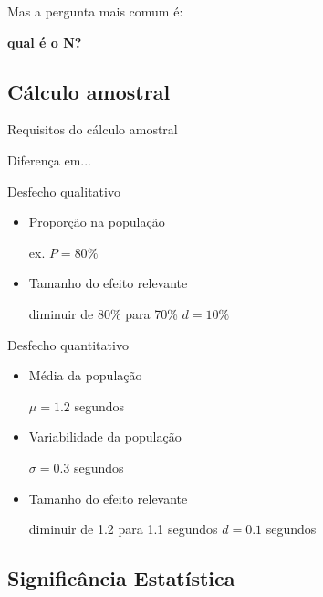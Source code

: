 \documentclass{beamer}
\begin{document}
\begin{frame}
  \begin{center}
    Mas a pergunta mais comum é:

  \bigskip
  {\bf qual é o N?}
  \end{center}
\end{frame}

\subsection{Cálculo amostral}

\begin{frame}{\scriptsize Requisitos do cálculo amostral}
  \begin{block}{Diferença em...}
  \begin{block}{\scriptsize Desfecho qualitativo}
    \begin{itemize}
      \footnotesize
    \item Proporção na população

      {\tiny ex. $P = 80\%$}
    \item Tamanho do efeito relevante

      {\tiny diminuir de 80\% para 70\% \hfill $d=10\%$}
    \end{itemize}
  \end{block}
  \begin{block}{\scriptsize Desfecho quantitativo}
    \begin{itemize}
      \footnotesize
    \item Média da população

      {\tiny $\mu = 1.2$ segundos}
    \item Variabilidade da população

      {\tiny $\sigma = 0.3$ segundos}
    \item Tamanho do efeito relevante

      {\tiny diminuir de 1.2 para 1.1 segundos \hfill $d = 0.1$ segundos}
    \end{itemize}
  \end{block}
\end{block}
\end{frame}

\subsection[Significância]{Significância Estatística}
\end{document}
